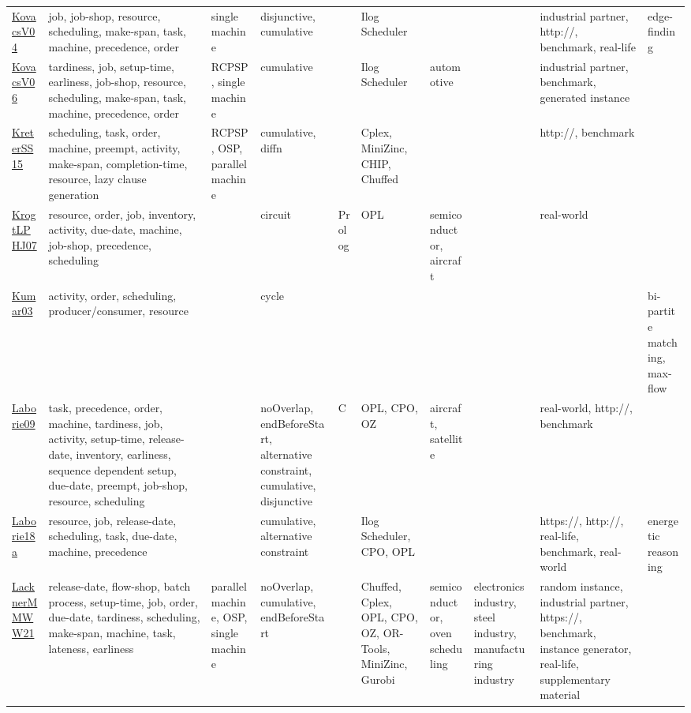 {\begin{longtable}{p{3cm}p{4cm}p{2cm}p{2cm}p{2cm}p{2cm}p{2cm}p{2cm}p{2cm}p{2cm}}
\href{papers/KovacsV04.pdf}{KovacsV04}~\cite{KovacsV04} & job, job-shop, resource, scheduling, make-span, task, machine, precedence, order & single machine & disjunctive, cumulative &  & Ilog Scheduler &  &  & industrial partner, http://, benchmark, real-life & edge-finding\\
\href{papers/KovacsV06.pdf}{KovacsV06}~\cite{KovacsV06} & tardiness, job, setup-time, earliness, job-shop, resource, scheduling, make-span, task, machine, precedence, order & RCPSP, single machine & cumulative &  & Ilog Scheduler & automotive &  & industrial partner, benchmark, generated instance & \\
\href{papers/KreterSS15.pdf}{KreterSS15}~\cite{KreterSS15} & scheduling, task, order, machine, preempt, activity, make-span, completion-time, resource, lazy clause generation & RCPSP, OSP, parallel machine & cumulative, diffn &  & Cplex, MiniZinc, CHIP, Chuffed &  &  & http://, benchmark & \\
\href{papers/KrogtLPHJ07.pdf}{KrogtLPHJ07}~\cite{KrogtLPHJ07} & resource, order, job, inventory, activity, due-date, machine, job-shop, precedence, scheduling &  & circuit & Prolog & OPL & semiconductor, aircraft &  & real-world & \\
\href{papers/Kumar03.pdf}{Kumar03}~\cite{Kumar03} & activity, order, scheduling, producer/consumer, resource &  & cycle &  &  &  &  &  & bi-partite matching, max-flow\\
\href{papers/Laborie09.pdf}{Laborie09}~\cite{Laborie09} & task, precedence, order, machine, tardiness, job, activity, setup-time, release-date, inventory, earliness, sequence dependent setup, due-date, preempt, job-shop, resource, scheduling &  & noOverlap, endBeforeStart, alternative constraint, cumulative, disjunctive & C  & OPL, CPO, OZ & aircraft, satellite &  & real-world, http://, benchmark & \\
\href{papers/Laborie18a.pdf}{Laborie18a}~\cite{Laborie18a} & resource, job, release-date, scheduling, task, due-date, machine, precedence &  & cumulative, alternative constraint &  & Ilog Scheduler, CPO, OPL &  &  & https://, http://, real-life, benchmark, real-world & energetic reasoning\\
\href{papers/LacknerMMWW21.pdf}{LacknerMMWW21}~\cite{LacknerMMWW21} & release-date, flow-shop, batch process, setup-time, job, order, due-date, tardiness, scheduling, make-span, machine, task, lateness, earliness & parallel machine, OSP, single machine & noOverlap, cumulative, endBeforeStart &  & Chuffed, Cplex, OPL, CPO, OZ, OR-Tools, MiniZinc, Gurobi & semiconductor, oven scheduling & electronics industry, steel industry, manufacturing industry & random instance, industrial partner, https://, benchmark, instance generator, real-life, supplementary material & \\

\end{longtable}}
